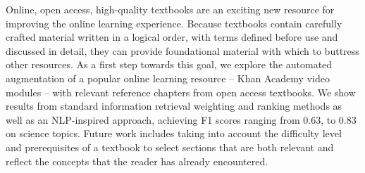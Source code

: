 Online, open access, high-quality textbooks are an exciting new resource for improving the online learning experience. Because textbooks contain carefully crafted  material written in a logical order, with terms defined before use and discussed in detail, they can provide foundational material with which to buttress other resources.  As a first step towards this goal, we explore the automated augmentation of a popular online learning resource -- Khan Academy video modules -- with relevant reference chapters from open access textbooks.  We show results from standard information retrieval weighting and ranking methods as well as an NLP-inspired approach, achieving F1 scores ranging from 0.63, to 0.83 on science topics.  Future work includes taking into account the difficulty level and prerequisites of a textbook to select sections that are both relevant and reflect the concepts that the reader has already encountered.
